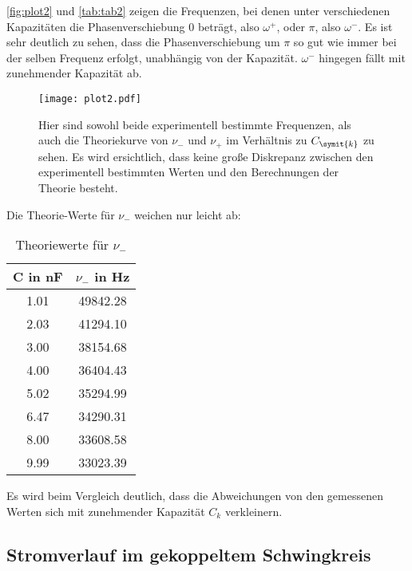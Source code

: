 \autoref{fig:plot2} und \autoref{tab:tab2} zeigen die Frequenzen, bei denen unter verschiedenen Kapazitäten die Phasenverschiebung 0 beträgt, also \(\omega^+\), oder \(\pi\), also \(\omega^-\).
Es ist sehr deutlich zu sehen, dass die Phasenverschiebung um \(\pi\) so gut wie immer bei der selben Frequenz erfolgt, unabhängig von der Kapazität.
\(\omega^-\) hingegen fällt mit zunehmender Kapazität ab.
\begin{figure}
  \centering
  \texttt{[image: plot2.pdf]}
  \caption{Hier sind sowohl beide experimentell bestimmte Frequenzen, als auch die Theoriekurve von \(\nu_-\) und \(\nu_+\) im Verhältnis zu \(C_{\symit{k}}\) zu sehen. Es wird ersichtlich, dass keine große Diskrepanz zwischen den experimentell bestimmten Werten und den Berechnungen der Theorie besteht.}
  \label{fig:plot2}
\end{figure}
\newpage
Die Theorie-Werte für \(\nu_-\) weichen nur leicht ab:
\\
\begin{table}
  \centering
  \caption{Theoriewerte für \(\nu_-\)}
  \label{tab:tab3}
  \begin{tabular}{c c}
    \toprule
    C in nF & \(\nu_-\) in Hz\\
    \midrule
    1.01 & 49842.28\\
    2.03 & 41294.10\\
    3.00 & 38154.68\\
    4.00 & 36404.43\\
    5.02 & 35294.99\\
    6.47 & 34290.31\\
    8.00 & 33608.58\\
    9.99 & 33023.39\\
    \bottomrule
  \end{tabular}
\end{table}
Es wird beim Vergleich deutlich, dass die  Abweichungen von den gemessenen Werten sich mit zunehmender Kapazität \(C_k\) verkleinern. 
\newpage
\subsection{Stromverlauf im gekoppeltem Schwingkreis}

